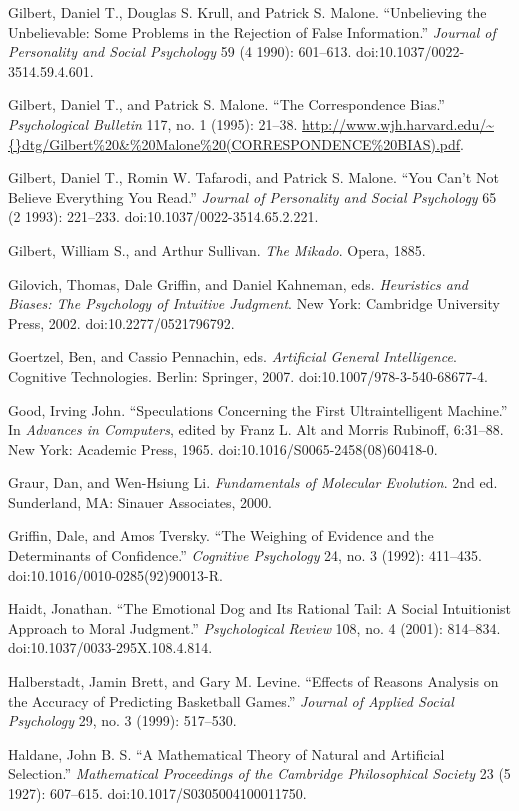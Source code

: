 \documentclass[letterpaper]{book}
\begin{document}
{
 Gilbert, Daniel T., Douglas S. Krull, and Patrick S. Malone.
``Unbelieving the Unbelievable: Some Problems in the
Rejection of False Information.'' \textit{Journal of
Personality and Social Psychology} 59 (4 1990): 601--613.
doi:10.1037/0022-3514.59.4.601.}

{
 Gilbert, Daniel T., and Patrick S. Malone. ``The
Correspondence Bias.'' \textit{Psychological
Bulletin} 117, no. 1 (1995): 21--38.
\url{http://www.wjh.harvard.edu/\~{}dtg/Gilbert\%20\&\%20Malone\%20(CORRESPONDENCE\%20BIAS).pdf}.}

{
 Gilbert, Daniel T., Romin W. Tafarodi, and Patrick S. Malone.
``You Can't Not Believe Everything You
Read.'' \textit{Journal of Personality and Social
Psychology} 65 (2 1993): 221--233. doi:10.1037/0022-3514.65.2.221.}

{
 Gilbert, William S., and Arthur Sullivan. \textit{The Mikado}.
Opera, 1885.}

{
 Gilovich, Thomas, Dale Griffin, and Daniel Kahneman, eds.
\textit{Heuristics and Biases: The Psychology of Intuitive Judgment}.
New York: Cambridge University Press, 2002. doi:10.2277/0521796792.}

{
 Goertzel, Ben, and Cassio Pennachin, eds. \textit{Artificial
General Intelligence}. Cognitive Technologies. Berlin: Springer, 2007.
doi:10.1007/978-3-540-68677-4.}

{
 Good, Irving John. ``Speculations Concerning the
First Ultraintelligent Machine.'' In \textit{Advances
in Computers}, edited by Franz L. Alt and Morris Rubinoff, 6:31--88.
New York: Academic Press, 1965. doi:10.1016/S0065-2458(08)60418-0.}

{
 Graur, Dan, and Wen-Hsiung Li. \textit{Fundamentals of Molecular
Evolution}. 2nd ed. Sunderland, MA: Sinauer Associates, 2000.}

{
 Griffin, Dale, and Amos Tversky. ``The Weighing
of Evidence and the Determinants of Confidence.''
\textit{Cognitive Psychology} 24, no. 3 (1992): 411--435.
doi:10.1016/0010-0285(92)90013-R.}

{
 Haidt, Jonathan. ``The Emotional Dog and Its
Rational Tail: A Social Intuitionist Approach to Moral
Judgment.'' \textit{Psychological Review} 108, no. 4
(2001): 814--834. doi:10.1037/0033-295X.108.4.814.}

{
 Halberstadt, Jamin Brett, and Gary M. Levine.
``Effects of Reasons Analysis on the Accuracy of
Predicting Basketball Games.'' \textit{Journal of
Applied Social Psychology} 29, no. 3 (1999): 517--530.}

{
 Haldane, John B. S. ``A Mathematical Theory of
Natural and Artificial Selection.''
\textit{Mathematical Proceedings of the Cambridge Philosophical
Society} 23 (5 1927): 607--615. doi:10.1017/S0305004100011750.}
\end{document}
